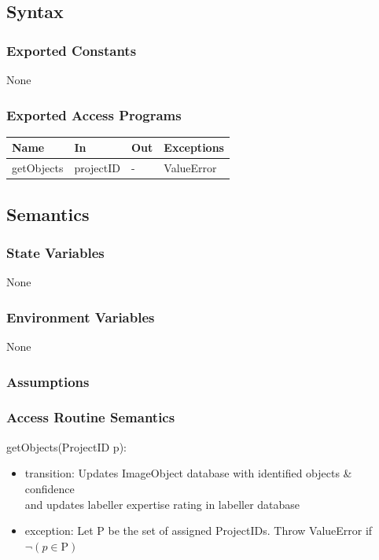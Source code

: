 \documentclass[12pt, titlepage]{article}
\begin{document}
  \subsection{Syntax}


  
  \subsubsection{Exported Constants}
  None
  \subsubsection{Exported Access Programs}
  
  \begin{center}
  \begin{tabular}{p{2cm} p{4cm} p{4cm} p{2cm}}
  \hline
  \textbf{Name} & \textbf{In} & \textbf{Out} & \textbf{Exceptions} \\
  \hline
  getObjects & projectID & - & ValueError \\
  
  \end{tabular}
  \end{center}
  
  \subsection{Semantics}
  
  \subsubsection{State Variables}
  
 None
  
  \subsubsection{Environment Variables}
  
  None
  
  \subsubsection{Assumptions}
  
  
  \subsubsection{Access Routine Semantics}
  
  \noindent getObjects(ProjectID p):
  \begin{itemize}
  \item transition: Updates ImageObject database with identified objects \& confidence\\
  and updates labeller expertise rating in labeller database
  \item exception: Let P be the set of assigned ProjectIDs. Throw ValueError if $\neg (p \in \text{P})$\\
  \end{itemize}
\end{document}
